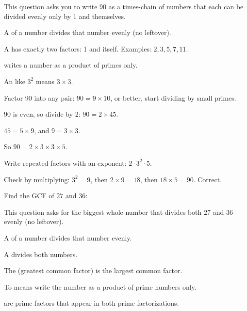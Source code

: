 
This question asks you to write 90 as a times-chain of numbers that each can be divided evenly only by 1 and themselves.

\begin{words}
  \item A of a number divides that number evenly (no leftover).
  \item A has exactly two factors: 1 and itself. Examples: $2, 3, 5, 7, 11$.
  \item {}writes a number as a product of primes only.
  \item An like $3^{2}$ means $3 \times 3$.
\end{words}

\begin{steps}
  \item Factor 90 into any pair: $90 = 9 \times 10$, or better, start dividing by small primes.
  \item 90 is even, so divide by 2: $90 = 2 \times 45$.
  \item $45 = 5 \times 9$, and $9 = 3 \times 3$.
  \item So $90 = 2 \times 3 \times 3 \times 5$.
  \item Write repeated factors with an exponent: $2 \cdot 3^{2} \cdot 5$.
\end{steps}


Check by multiplying: $3^{2} = 9$, then $2 \times 9 = 18$, then $18 \times 5 = 90$. Correct.


Find the GCF of $27$ and $36$:\ \blank[2.4cm]


This question asks for the biggest whole number that divides both 27 and 36 evenly (no leftover).

\begin{words}
  \item A of a number divides that number evenly.
  \item A divides both numbers.
  \item The (greatest common factor) is the largest common factor.
  \item To means write the number as a product of prime numbers only.
  \item {}are prime factors that appear in both prime factorizations.
\end{words}

